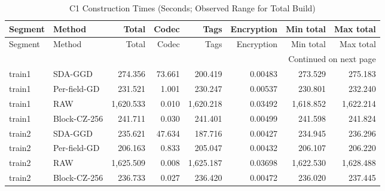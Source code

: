 \begingroup\small\setlength{\tabcolsep}{5pt}
\begin{longtable}{@{}llrrrrrr@{}}
\caption{C1 Construction Times (Seconds; Observed Range for Total Build)}\label{tab:c1-time}\\
\toprule Segment & Method & Total & Codec & Tags & Encryption & Min total & Max total\\\midrule\endfirsthead
\toprule Segment & Method & Total & Codec & Tags & Encryption & Min total & Max total\\\midrule\endhead
\midrule\multicolumn{8}{r}{Continued on next page}\\\endfoot
\bottomrule\endlastfoot
train1 & SDA-GGD & 274.356 & 73.661 & 200.419 & 0.00483 & 273.529 & 275.183\\
train1 & Per-field-GD & 231.521 & 1.001 & 230.247 & 0.00537 & 230.801 & 232.240\\
train1 & RAW & 1,620.533 & 0.010 & 1,620.218 & 0.03492 & 1,618.852 & 1,622.214\\
train1 & Block-CZ-256 & 241.711 & 0.030 & 241.401 & 0.00499 & 241.598 & 241.824\\
train2 & SDA-GGD & 235.621 & 47.634 & 187.716 & 0.00427 & 234.945 & 236.296\\
train2 & Per-field-GD & 206.163 & 0.833 & 205.047 & 0.00432 & 206.107 & 206.220\\
train2 & RAW & 1,625.509 & 0.008 & 1,625.187 & 0.03698 & 1,622.530 & 1,628.488\\
train2 & Block-CZ-256 & 236.733 & 0.027 & 236.420 & 0.00472 & 236.020 & 237.445\\
\end{longtable}
\endgroup
